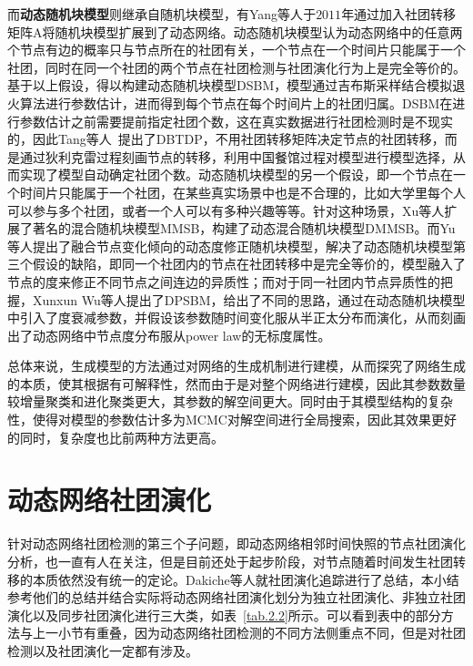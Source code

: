 而\textbf{动态随机块模型}则继承自随机块模型，有Yang等人\cite{yang2011detecting}于$2011$年通过加入社团转移矩阵A将随机块模型扩展到了动态网络。动态随机块模型认为动态网络中的任意两个节点有边的概率只与节点所在的社团有关，一个节点在一个时间片只能属于一个社团，同时在同一个社团的两个节点在社团检测与社团演化行为上是完全等价的。基于以上假设，得以构建动态随机块模型DSBM，模型通过吉布斯采样结合模拟退火算法进行参数估计，进而得到每个节点在每个时间片上的社团归属。DSBM在进行参数估计之前需要提前指定社团个数，这在真实数据进行社团检测时是不现实的，因此Tang等人~\cite{tang2014detecting}提出了DBTDP，不用社团转移矩阵决定节点的社团转移，而是通过狄利克雷过程刻画节点的转移，利用中国餐馆过程对模型进行模型选择，从而实现了模型自动确定社团个数。动态随机块模型的另一个假设，即一个节点在一个时间片只能属于一个社团，在某些真实场景中也是不合理的，比如大学里每个人可以参与多个社团，或者一个人可以有多种兴趣等等。针对这种场景，Xu\cite{xu2013dynamic}等人扩展了著名的混合随机块模型MMSB，构建了动态混合随机块模型DMMSB。而Yu\cite{yu2018detecting}等人提出了融合节点变化倾向的动态度修正随机块模型，解决了动态随机块模型第三个假设的缺陷，即同一个社团内的节点在社团转移中是完全等价的，模型融入了节点的度来修正不同节点之间连边的异质性；而对于同一社团内节点异质性的把握，Xunxun Wu等人\cite{wu2019dynamic}提出了DPSBM，给出了不同的思路，通过在动态随机块模型中引入了度衰减参数，并假设该参数随时间变化服从半正太分布而演化，从而刻画出了动态网络中节点度分布服从power law的无标度属性。

总体来说，生成模型的方法通过对网络的生成机制进行建模，从而探究了网络生成的本质，使其根据有可解释性，然而由于是对整个网络进行建模，因此其参数数量较增量聚类和进化聚类更大，其参数的解空间更大。同时由于其模型结构的复杂性，使得对模型的参数估计多为MCMC对解空间进行全局搜索，因此其效果更好的同时，复杂度也比前两种方法更高。

\section{动态网络社团演化}

针对动态网络社团检测的第三个子问题，即动态网络相邻时间快照的节点社团演化分析，也一直有人在关注，但是目前还处于起步阶段，对节点随着时间发生社团转移的本质依然没有统一的定论。Dakiche等人\cite{dakiche2019tracking}就社团演化追踪进行了总结，本小结参考他们的总结并结合实际将动态网络社团演化划分为独立社团演化、非独立社团演化以及同步社团演化进行三大类，如表~\ref{tab.2.2}所示。可以看到表中的部分方法与上一小节有重叠，因为动态网络社团检测的不同方法侧重点不同，但是对社团检测以及社团演化一定都有涉及。

